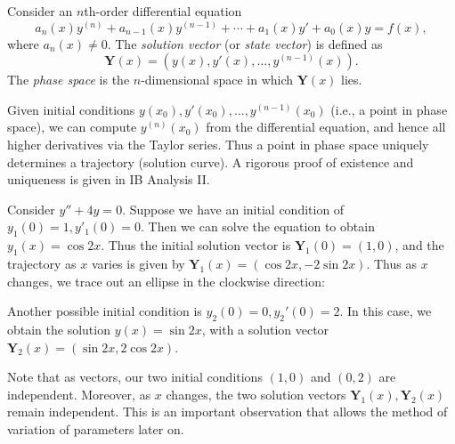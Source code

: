 \documentclass[a4paper]{article}
\begin{document}
\begin{defi}
  Consider an $n$th-order differential equation
  \[
    a_n(x) y^{(n)} + a_{n - 1}(x)y^{(n - 1)} + \cdots + a_1(x) y' + a_0 (x) y = f(x),
  \]
  where $a_n(x) \neq 0$. The \emph{solution vector} (or \emph{state vector}) is defined as
  \[
    \mathbf{Y}(x) = (y(x), y'(x), \ldots, y^{(n-1)}(x)).
  \]
  The \emph{phase space} is the $n$-dimensional space in which $\mathbf{Y}(x)$ lies.
\end{defi}

\begin{remark}
  Given initial conditions $y(x_0), y'(x_0), \ldots, y^{(n-1)}(x_0)$ (i.e., a point in phase space), we can compute $y^{(n)}(x_0)$ from the differential equation, and hence all higher derivatives via the Taylor series. Thus a point in phase space uniquely determines a trajectory (solution curve). A rigorous proof of existence and uniqueness is given in IB Analysis II.
\end{remark}

\begin{eg}
  Consider $y'' + 4y = 0$. Suppose we have an initial condition of $y_1(0) = 1, y'_1(0) = 0$. Then we can solve the equation to obtain $y_1(x) = \cos 2x$. Thus the initial solution vector is $\mathbf{Y}_1(0) = (1, 0)$, and the trajectory as $x$ varies is given by $\mathbf{Y}_1(x) = (\cos 2x, -2 \sin 2x)$. Thus as $x$ changes, we trace out an ellipse in the clockwise direction:
   \begin{center}
  \end{center}
  Another possible initial condition is $y_2(0) = 0, y_2'(0) = 2$. In this case, we obtain the solution $y(x) = \sin 2x$, with a solution vector $\mathbf{Y}_2(x) = (\sin 2x, 2 \cos 2x)$.

  Note that as vectors, our two initial conditions $(1, 0)$ and $(0, 2)$ are independent. Moreover, as $x$ changes, the two solution vectors $\mathbf{Y}_1(x), \mathbf{Y}_2(x)$ remain independent. This is an important observation that allows the method of variation of parameters later on.
\end{eg}
\end{document}
